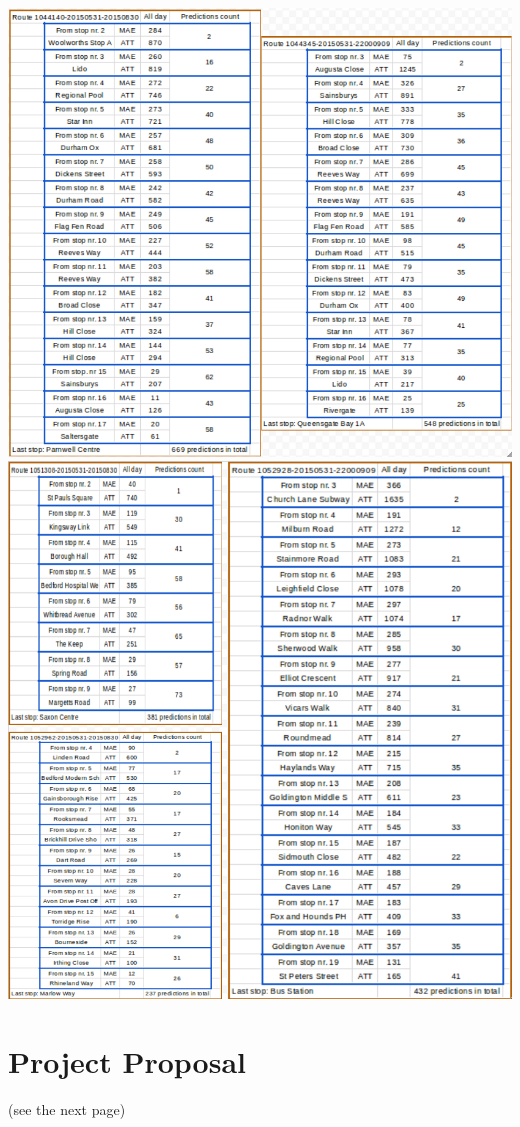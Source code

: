 \documentclass[12pt,a4paper,oneside,openright]{report}
\begin{document}
\includegraphics[width=\textwidth]{figs/routes_1044140_1044345.png}
\includegraphics[width=\textwidth]{figs/routes_1051308_1052928_1052962.png}


\chapter{Project Proposal}
(see the next page)


\end{document}
